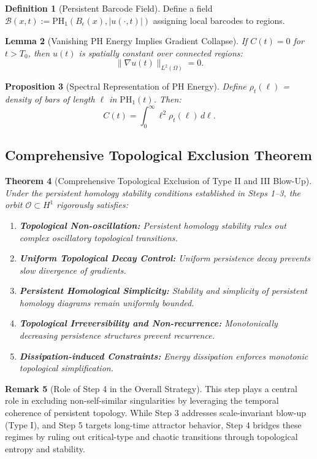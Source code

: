 \documentclass[11pt]{article}
\newtheorem{theorem}{Theorem}[section]
\newtheorem{lemma}[theorem]{Lemma}
\newtheorem{proposition}[theorem]{Proposition}
\theoremstyle{definition}
\newtheorem{definition}[theorem]{Definition}
\newtheorem{remark}[theorem]{Remark}
\begin{document}
\begin{definition}[Persistent Barcode Field]
Define a field $\mathcal{B}(x,t) := \mathrm{PH}_1(B_\epsilon(x), |u(\cdot,t)|)$ assigning local barcodes to regions.
\end{definition}

\begin{lemma}[Vanishing PH Energy Implies Gradient Collapse]
If $C(t) = 0$ for $t > T_0$, then $u(t)$ is spatially constant over connected regions:
\[
\|\nabla u(t)\|_{L^2(\Omega)} = 0.
\]
\end{lemma}

\begin{proposition}[Spectral Representation of PH Energy]
Define $\rho_t(\ell)$ = density of bars of length $\ell$ in $\mathrm{PH}_1(t)$. Then:
\[
C(t) = \int_0^\infty \ell^2 \rho_t(\ell) \, d\ell.
\]
\end{proposition}

\subsection*{Comprehensive Topological Exclusion Theorem}

\begin{theorem}[Comprehensive Topological Exclusion of Type II and III Blow-Up]
\label{thm:comprehensive_exclusion}
Under the persistent homology stability conditions established in Steps 1--3, the orbit $\mathcal{O} \subset H^1$ rigorously satisfies:
\begin{enumerate}
  \item \textbf{Topological Non-oscillation:} Persistent homology stability rules out complex oscillatory topological transitions.
  \item \textbf{Uniform Topological Decay Control:} Uniform persistence decay prevents slow divergence of gradients.
  \item \textbf{Persistent Homological Simplicity:} Stability and simplicity of persistent homology diagrams remain uniformly bounded.
  \item \textbf{Topological Irreversibility and Non-recurrence:} Monotonically decreasing persistence structures prevent recurrence.
  \item \textbf{Dissipation-induced Constraints:} Energy dissipation enforces monotonic topological simplification.
\end{enumerate}
\end{theorem}

\begin{remark}[Role of Step 4 in the Overall Strategy]
This step plays a central role in excluding non-self-similar singularities by leveraging the temporal coherence of persistent topology. While Step 3 addresses scale-invariant blow-up (Type I), and Step 5 targets long-time attractor behavior, Step 4 bridges these regimes by ruling out critical-type and chaotic transitions through topological entropy and stability.
\end{remark}
\end{document}
